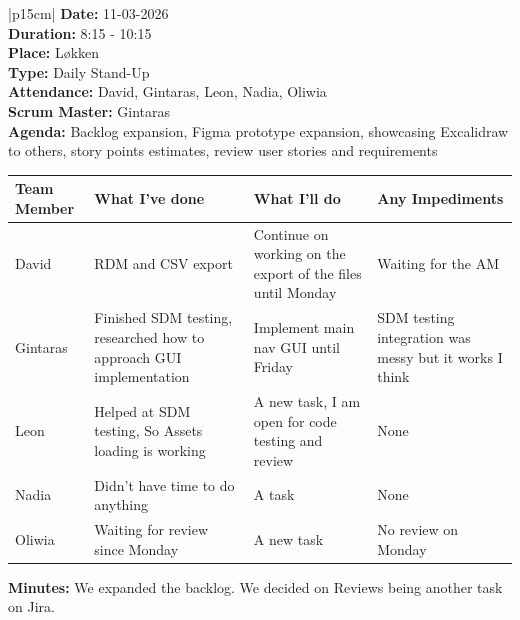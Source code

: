 \begin{table}[H]
    \centering
    \begin{tabular}{|p{15cm}|}   
        \hline
        \textbf{Date:}  11-03-2026 \\
        \textbf{Duration:}  8:15 - 10:15 \\
        \textbf{Place:}  Løkken \\
        \textbf{Type:}  Daily Stand-Up \\
        \textbf{Attendance:}  David, Gintaras, Leon, Nadia, Oliwia \\
        \textbf{Scrum Master:}  Gintaras \\
        \textbf{Agenda:}  Backlog expansion, Figma prototype expansion, showcasing Excalidraw to others, story points estimates, review user stories and requirements
        \begin{table}[H]
            \begin{tabular}{|p{1.75cm}|p{4cm}|p{4cm}|p{4cm}|}
                \hline
                \cellcolor[HTML]{BFBFBF}  \textbf{Team Member} & \cellcolor[HTML]{BFBFBF}  \textbf{What I've done} & \cellcolor[HTML]{BFBFBF}  \textbf{What I'll do} & \cellcolor[HTML]{BFBFBF}  \textbf{Any Impediments}\\
                \hline
                \cellcolor[HTML]{d4d4d4} David & RDM and CSV export & Continue on working on the export of the files until Monday & Waiting for the AM \\
                \hline
                \cellcolor[HTML]{d4d4d4} Gintaras & Finished SDM testing, researched how to approach GUI implementation & Implement main nav GUI until Friday & SDM testing integration was messy but it works I think \\
                \hline
                \cellcolor[HTML]{d4d4d4} Leon & Helped at SDM testing, So Assets loading is working & A new task, I am open for code testing and review & None \\
                \hline
                \cellcolor[HTML]{d4d4d4} Nadia & Didn't have time to do anything & A task & None \\
                \hline
                \cellcolor[HTML]{d4d4d4} Oliwia & Waiting for review since Monday & A new task & No review on Monday \\
                \hline
            \end{tabular}
        \end{table}
        \textbf{Minutes:}  We expanded the backlog. We decided on Reviews being another task on Jira. \\
        \hline
    \end{tabular}
\end{table}

